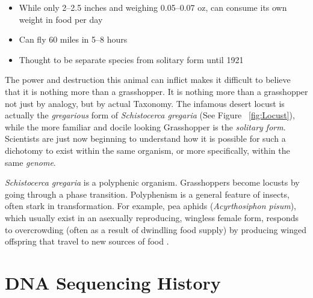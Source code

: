 \begin{itemize}
  \item While only 2–2.5 inches and weighing 0.05–0.07 oz, can consume its own weight in food per day
  \item Can fly 60 miles in 5–8 hours
  \item Thought to be separate species from solitary form until 1921 
\end{itemize}

The power and destruction this animal can inflict makes it difficult to believe that it is nothing more than a grasshopper. It is nothing more than a grasshopper not just by analogy, but by actual Taxonomy. The infamous desert locust is actually the \textit{gregarious} form  of \textit{Schistocerca gregaria} (See Figure ~\ref{fig:Locust}), while the more familiar and docile looking Grasshopper is the \textit{solitary form}. Scientists are just now beginning to understand how it is possible for such a dichotomy to exist within the same organism, or more specifically, within the same \textit{genome}.

\textit{Schistocerca gregaria} is a polyphenic organism. Grasshoppers become locusts by going through a phase transition. Polyphenism is a general feature of insects, often stark in transformation. For example, pea aphids (\textit{Acyrthosiphon pisum}), which usually exist in an asexually reproducing, wingless female form, responds to overcrowding (often as a result of dwindling food supply) by producing winged offspring that travel to new sources of food \citep{Shingleton2003,Purandare2014b}.


\section{DNA Sequencing History} %

